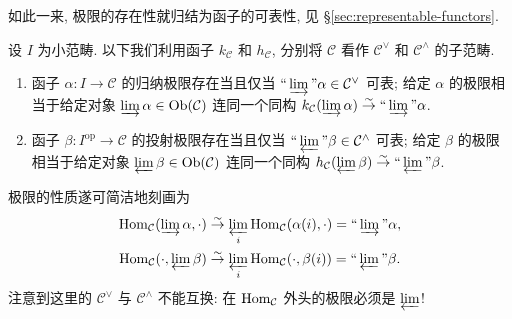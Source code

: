 如此一来, 极限的存在性就归结为函子的可表性, 见 \S\ref{sec:representable-functors}.

\begin{proposition}\label{prop:lim-as-fct}
	设 $I$ 为小范畴. 以下我们利用函子 $k_{\mathcal{C}}$ 和 $h_{\mathcal{C}}$, 分别将 $\mathcal{C}$ 看作 $\mathcal{C}^\vee$ 和 $\mathcal{C}^\wedge$ 的子范畴.
	\begin{enumerate}
		\item 函子 $\alpha: I \to \mathcal{C}$ 的归纳极限存在当且仅当 $\Yinjlim \alpha \in \mathcal{C}^\vee$ 可表; 给定 $\alpha$ 的极限相当于给定对象 $\varinjlim \alpha \in \operatorname{Ob}(\mathcal{C})$ 连同一个同构 $k_{\mathcal{C}}(\varinjlim \alpha) \rightiso \Yinjlim \alpha$.
		\item 函子 $\beta: I^\text{op} \to \mathcal{C}$ 的投射极限存在当且仅当 $\Yprojlim \beta \in \mathcal{C}^\wedge$ 可表; 给定 $\beta$ 的极限相当于给定对象 $\varprojlim \beta \in \operatorname{Ob}(\mathcal{C})$ 连同一个同构 $h_{\mathcal{C}}(\varprojlim \beta) \rightiso \Yprojlim \beta$.
	\end{enumerate}
\end{proposition}
极限的性质遂可简洁地刻画为
\begin{align*}
	\Hom_{\mathcal{C}}(\varinjlim \alpha, \cdot) & \rightiso \varprojlim_i \Hom_{\mathcal{C}}(\alpha(i), \cdot) = \Yinjlim \alpha, \\
	\Hom_{\mathcal{C}}(\cdot, \varprojlim \beta) & \rightiso \varprojlim_i \Hom_{\mathcal{C}}(\cdot, \beta(i)) = \Yprojlim \beta.
\end{align*}
注意到这里的 $\mathcal{C}^\vee$ 与 $\mathcal{C}^\wedge$ 不能互换: 在 $\operatorname{Hom}_{\mathcal{C}}$ 外头的极限必须是 $\varprojlim$!

